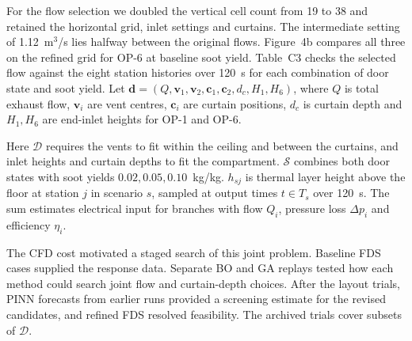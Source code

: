 For the flow selection we doubled the vertical cell count from 19 to 38 and retained the horizontal grid, inlet settings and curtains. The intermediate setting of 1.12~m$^3$/s lies halfway between the original flows. Figure~4b compares all three on the refined grid for OP-6 at baseline soot yield. Table~C3 checks the selected flow against the eight station histories over 120~s for each combination of door state and soot yield.
\clearpage
{}
Let $\mathbf d=(Q,\mathbf v_1,\mathbf v_2,\mathbf c_1,\mathbf c_2,d_c,H_1,H_6)$, where $Q$ is total exhaust flow, $\mathbf v_i$ are vent centres, $\mathbf c_i$ are curtain positions, $d_c$ is curtain depth and $H_1,H_6$ are end-inlet heights for OP-1 and OP-6.

Here $\mathcal D$ requires the vents to fit within the ceiling and between the curtains, and inlet heights and curtain depths to fit the compartment. $\mathcal S$ combines both door states with soot yields $0.02,0.05,0.10$~kg/kg. $h_{sj}$ is thermal layer height above the floor at station $j$ in scenario $s$, sampled at output times $t\in T_s$ over 120~s. The sum estimates electrical input for branches with flow $Q_i$, pressure loss $\Delta p_i$ and efficiency $\eta_i$.

The CFD cost motivated a staged search of this joint problem. Baseline FDS cases supplied the response data. Separate BO and GA replays tested how each method could search joint flow and curtain-depth choices. After the layout trials, PINN forecasts from earlier runs provided a screening estimate for the revised candidates, and refined FDS resolved feasibility. The archived trials cover subsets of $\mathcal D$.
